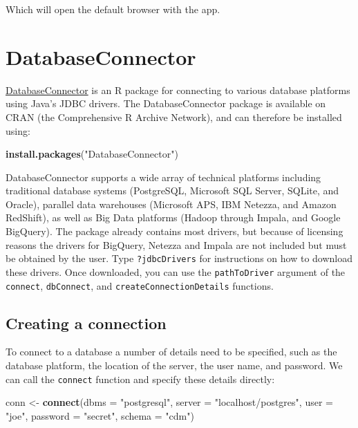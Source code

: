 \documentclass[]{book}
\newenvironment{Shaded}{\begin{snugshade}}{\end{snugshade}}
\newcommand{\KeywordTok}[1]{\textcolor[rgb]{0.13,0.29,0.53}{\textbf{#1}}}
\newcommand{\DataTypeTok}[1]{\textcolor[rgb]{0.13,0.29,0.53}{#1}}
\newcommand{\StringTok}[1]{\textcolor[rgb]{0.31,0.60,0.02}{#1}}
\newcommand{\NormalTok}[1]{#1}
\begin{document}
Which will open the default browser with the app.

\section{DatabaseConnector}\label{DatabaseConnector}

\href{https://ohdsi.github.io/DatabaseConnector/}{DatabaseConnector} is
an R package for connecting to various database platforms using Java's
JDBC drivers. The DatabaseConnector package is available on CRAN (the
Comprehensive R Archive Network), and can therefore be installed using:

\begin{Shaded}
\begin{Highlighting}[]
\KeywordTok{install.packages}\NormalTok{(}\StringTok{"DatabaseConnector"}\NormalTok{)}
\end{Highlighting}
\end{Shaded}

DatabaseConnector supports a wide array of technical platforms including
traditional database systems (PostgreSQL, Microsoft SQL Server, SQLite,
and Oracle), parallel data warehouses (Microsoft APS, IBM Netezza, and
Amazon RedShift), as well as Big Data platforms (Hadoop through Impala,
and Google BigQuery). The package already contains most drivers, but
because of licensing reasons the drivers for BigQuery, Netezza and
Impala are not included but must be obtained by the user. Type
\texttt{?jdbcDrivers} for instructions on how to download these drivers.
Once downloaded, you can use the \texttt{pathToDriver} argument of the
\texttt{connect}, \texttt{dbConnect}, and
\texttt{createConnectionDetails} functions.

\subsection{Creating a connection}\label{creating-a-connection}

To connect to a database a number of details need to be specified, such
as the database platform, the location of the server, the user name, and
password. We can call the \texttt{connect} function and specify these
details directly:

\begin{Shaded}
\begin{Highlighting}[]
\NormalTok{conn <-}\StringTok{ }\KeywordTok{connect}\NormalTok{(}\DataTypeTok{dbms =} \StringTok{"postgresql"}\NormalTok{,}
                \DataTypeTok{server =} \StringTok{"localhost/postgres"}\NormalTok{,}
                \DataTypeTok{user =} \StringTok{"joe"}\NormalTok{,}
                \DataTypeTok{password =} \StringTok{"secret"}\NormalTok{,}
                \DataTypeTok{schema =} \StringTok{"cdm"}\NormalTok{)}
\end{Highlighting}
\end{Shaded}
\end{document}
